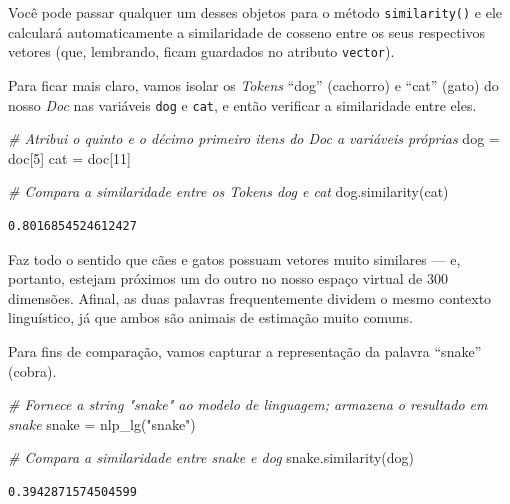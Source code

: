 \documentclass[
  brazilian,
]{article}
\newenvironment{Shaded}{}{}
\newcommand{\CommentTok}[1]{\textcolor[rgb]{0.38,0.63,0.69}{\textit{#1}}}
\newcommand{\DecValTok}[1]{\textcolor[rgb]{0.25,0.63,0.44}{#1}}
\newcommand{\NormalTok}[1]{#1}
\newcommand{\OperatorTok}[1]{\textcolor[rgb]{0.40,0.40,0.40}{#1}}
\newcommand{\StringTok}[1]{\textcolor[rgb]{0.25,0.44,0.63}{#1}}
\begin{document}
Você pode passar qualquer um desses objetos para o método
\texttt{similarity()} e ele calculará automaticamente a similaridade de
cosseno entre os seus respectivos vetores (que, lembrando, ficam
guardados no atributo \texttt{vector}).

Para ficar mais claro, vamos isolar os \emph{Tokens} ``dog'' (cachorro)
e ``cat'' (gato) do nosso \emph{Doc} nas variáveis \texttt{dog} e
\texttt{cat}, e então verificar a similaridade entre eles.

\begin{Shaded}
\begin{Highlighting}[]
\CommentTok{\# Atribui o quinto e o décimo primeiro itens do Doc a variáveis próprias}
\NormalTok{dog }\OperatorTok{=}\NormalTok{ doc[}\DecValTok{5}\NormalTok{]}
\NormalTok{cat }\OperatorTok{=}\NormalTok{ doc[}\DecValTok{11}\NormalTok{]}

\CommentTok{\# Compara a similaridade entre os Tokens \textquotesingle{}dog\textquotesingle{} e \textquotesingle{}cat\textquotesingle{}}
\NormalTok{dog.similarity(cat)}
\end{Highlighting}
\end{Shaded}

\begin{verbatim}
0.8016854524612427
\end{verbatim}

Faz todo o sentido que cães e gatos possuam vetores muito similares ---
e, portanto, estejam próximos um do outro no nosso espaço virtual de 300
dimensões. Afinal, as duas palavras frequentemente dividem o mesmo
contexto linguístico, já que ambos são animais de estimação muito
comuns.

Para fins de comparação, vamos capturar a representação da palavra
``snake'' (cobra).

\begin{Shaded}
\begin{Highlighting}[]
\CommentTok{\# Fornece a string "snake" ao modelo de linguagem; armazena o resultado em \textquotesingle{}snake\textquotesingle{}}
\NormalTok{snake }\OperatorTok{=}\NormalTok{ nlp\_lg(}\StringTok{"snake"}\NormalTok{)}

\CommentTok{\# Compara a similaridade entre \textquotesingle{}snake\textquotesingle{} e \textquotesingle{}dog\textquotesingle{}}
\NormalTok{snake.similarity(dog)}
\end{Highlighting}
\end{Shaded}

\begin{verbatim}
0.3942871574504599
\end{verbatim}
\end{document}
